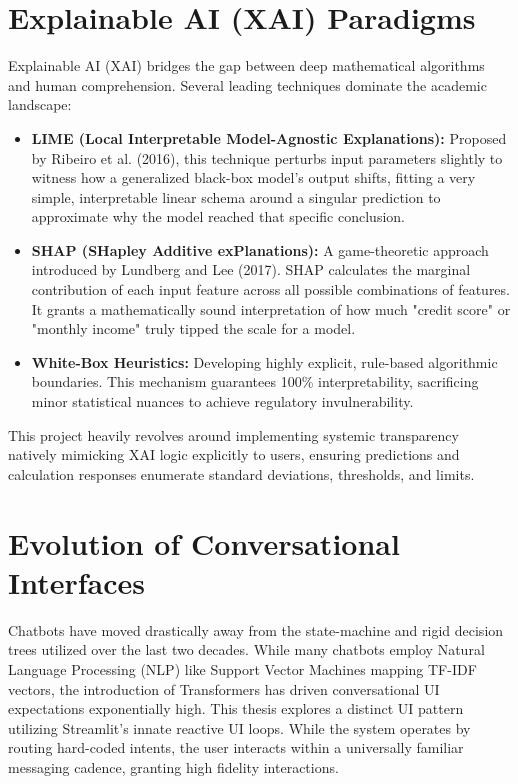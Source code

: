 \documentclass[12pt,a4paper]{report}
\begin{document}
\section{Explainable AI (XAI) Paradigms}
Explainable AI (XAI) bridges the gap between deep mathematical algorithms and human comprehension. Several leading techniques dominate the academic landscape:
\begin{itemize}
    \item \textbf{LIME (Local Interpretable Model-Agnostic Explanations):} Proposed by Ribeiro et al. (2016), this technique perturbs input parameters slightly to witness how a generalized black-box model's output shifts, fitting a very simple, interpretable linear schema around a singular prediction to approximate why the model reached that specific conclusion.
    \item \textbf{SHAP (SHapley Additive exPlanations):} A game-theoretic approach introduced by Lundberg and Lee (2017). SHAP calculates the marginal contribution of each input feature across all possible combinations of features. It grants a mathematically sound interpretation of how much "credit score" or "monthly income" truly tipped the scale for a model.
    \item \textbf{White-Box Heuristics:} Developing highly explicit, rule-based algorithmic boundaries. This mechanism guarantees 100\% interpretability, sacrificing minor statistical nuances to achieve regulatory invulnerability.
\end{itemize}
This project heavily revolves around implementing systemic transparency natively mimicking XAI logic explicitly to users, ensuring predictions and calculation responses enumerate standard deviations, thresholds, and limits.

\section{Evolution of Conversational Interfaces}
Chatbots have moved drastically away from the state-machine and rigid decision trees utilized over the last two decades. While many chatbots employ Natural Language Processing (NLP) like Support Vector Machines mapping TF-IDF vectors, the introduction of Transformers has driven conversational UI expectations exponentially high. This thesis explores a distinct UI pattern utilizing Streamlit's innate reactive UI loops. While the system operates by routing hard-coded intents, the user interacts within a universally familiar messaging cadence, granting high fidelity interactions.
\end{document}

